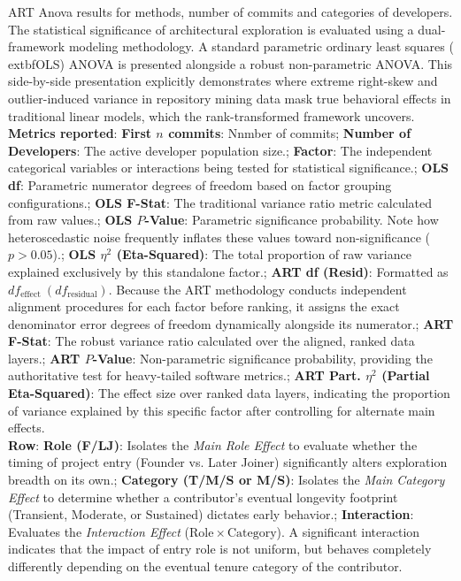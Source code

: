 \begin{landscape}
\begin{table}[H]
\centering
\setlength{\tabcolsep}{2pt}
\caption[ART Anova for all methods]{ART Anova results for methods, number of commits and categories of developers. The statistical significance of architectural exploration is evaluated using a dual-framework modeling methodology. A standard parametric ordinary least squares (	extbf{OLS}) ANOVA is presented alongside a robust non-parametric ANOVA. This side-by-side presentation explicitly demonstrates where extreme right-skew and outlier-induced variance in repository mining data mask true behavioral effects in traditional linear models, which the rank-transformed framework uncovers.\\ \textbf{Metrics reported}:   \textbf{First $n$ commits}: Nnmber of commits;  \textbf{Number of Developers}: The active developer population size.;  \textbf{Factor}: The independent categorical variables or interactions being tested for statistical significance.;  \textbf{OLS df}: Parametric numerator degrees of freedom based on factor grouping configurations.;  \textbf{OLS F-Stat}: The traditional variance ratio metric calculated from raw values.;  \textbf{OLS $P$-Value}: Parametric significance probability. Note how heteroscedastic noise frequently inflates these values toward non-significance ($p > 0.05$).;  \textbf{OLS $\eta^2$ (Eta-Squared)}: The total proportion of raw variance explained exclusively by this standalone factor.;  \textbf{ART df (Resid)}: Formatted as $df_{\mathrm{effect}}~(df_{\mathrm{residual}})$. Because the ART methodology conducts independent alignment procedures for each factor before ranking, it assigns the exact denominator error degrees of freedom dynamically alongside its numerator.;  \textbf{ART F-Stat}: The robust variance ratio calculated over the aligned, ranked data layers.;  \textbf{ART $P$-Value}: Non-parametric significance probability, providing the authoritative test for heavy-tailed software metrics.;  \textbf{ART Part. $\eta^2$ (Partial Eta-Squared)}: The effect size over ranked data layers, indicating the proportion of variance explained by this specific factor after controlling for alternate main effects.
\\ \textbf{Row}:   \textbf{Role (F/LJ)}: Isolates the \textit{Main Role Effect} to evaluate whether the timing of project entry (Founder vs. Later Joiner) significantly alters exploration breadth on its own.;  \textbf{Category (T/M/S or M/S)}: Isolates the \textit{Main Category Effect} to determine whether a contributor's eventual longevity footprint (Transient, Moderate, or Sustained) dictates early behavior.;  \textbf{Interaction}: Evaluates the \textit{Interaction Effect} ($\mathrm{Role} \times \mathrm{Category}$). A significant interaction indicates that the impact of entry role is not uniform, but behaves completely differently depending on the eventual tenure category of the contributor.
}
\end{table}
\end{landscape}

